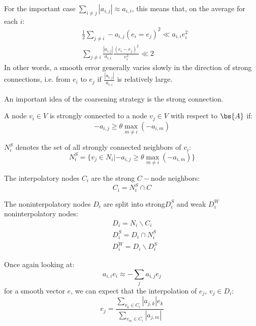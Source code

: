 For the important case $\sum_{i\neq j} |a_{i,j}| \approx a_{i,i}$, this means
that, on the average for each $i$:
\begin{align}
&\frac{1}{2} \sum_{j\neq i} -a_{i,j} (e_i=e_j)^2 \ll a_{i,i} e_i^2\\
&\sum_{j\neq i} \frac{|a_{i,j}|}{a_{i,i}} \frac{(e_i-e_j)^2}{e_i^2} \ll 2
\end{align}
In other words, a smooth error generally varies slowly in the direction of
strong connections, i.e. from $e_i$ to $e_j$ if $\frac{|a_{i,j}|}{a_{i,i}}$ is
relatively large.

An important idea of the coarsening strategy is the strong connection.
\begin{definition}
A node $v_i \in V$ is strongly connected to a node $v_j \in V$ with respect to
$\bs{A}$ if:
\begin{equation}
-a_{i,j} \geq \theta \max_{m\neq i}(-a_{i,m})
\end{equation}
\end{definition}
\begin{definition}
$N_i^S$ denotes the set of all strongly connected neighbors of $v_i$:
\begin{equation}
N_i^S =\{ v_j \in N_i | -a_{i,j}\geq \theta \max_{m\neq i} (-a_{i,m})\}
\end{equation}
\end{definition}
\begin{definition}
The interpolatory nodes $C_i$ are the strong $C-$node neighbors:
\begin{equation}
C_i = N_i^S \cap C
\end{equation}
\end{definition}
\begin{definition}
The noninterpolatory nodes $D_i$ are split into strong$D_i^S$ and weak $D_i^W$
noninterpolatory nodes:
\begin{align}
& D_i = N_i \backslash C_i\\ 
& D_i^S = D_i \cap N_i^S\\
& D_i^W = D_i \backslash D_i^S
\end{align}
\end{definition}
Once again looking at:
\begin{equation}
a_{i,i} e_i \approx - \sum_{j} a_{i,j} e_j
\end{equation}
for a smooth vector $e$, we can expect that the interpolation of $e_j$,
$v_j\in D_i$:
\begin{equation}
e_j = \frac{\sum_{v_k \in C_i} |a_{j,k}| e_k}{\sum_{v_m \in C_i} |a_{j,m}|}
\end{equation}
